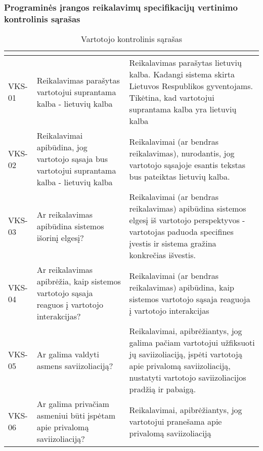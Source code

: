 \documentclass{VUMIFPSkursinis}
\begin{document}
			\subsubsection{Programinės įrangos reikalavimų specifikacijų vertinimo kontrolinis sąrašas}
			\begin{center}

				\begin{longtable}{|C{2cm}|L{5cm}|L{8cm}|}

					\caption{Vartotojo kontrolinis sąrašas}
					\label{table:VKS}

 					\\ \hline
 					 &
  					 & 
 					\\ \hline
 					VKS-01 &
 					Reikalavimas parašytas vartotojui suprantama kalba - lietuvių kalba& 
 					Reikalavimas parašytas lietuvių kalba. Kadangi sistema skirta Lietuvos Respublikos gyventojams. Tikėtina, kad vartotojui suprantama kalba yra lietuvių kalba\\ \hline
 					VKS-02 &
 					Reikalavimai apibūdina, jog vartotojo sąsaja bus vartotojui suprantama kalba - lietuvių kalba&
 					Reikalavimai (ar bendras reikalavimas), nurodantis, jog vartotojo sąsajoje esantis tekstas bus pateiktas lietuvių kalba.\\ \hline
 					VKS-03 &
 					Ar reikalavimas apibūdina sistemos išorinį elgesį? & 
					Reikalavimai (ar bendras reikalavimas) apibūdina sistemos elgesį iš vartotojo perspektyvos - vartotojas paduoda specifines įvestis ir sistema gražina konkrečias išvestis.\\ \hline  
 					VKS-04 &
 					Ar reikalavimas apibrėžia, kaip sistemos vartotojo sąsaja reaguos į vartotojo interakcijas?& 
 					Reikalavimai (ar bendras reikalavimas) apibūdina, kaip sistemos vartotojo sąsaja reaguoja į vartotojo interakcijas\\ \hline    
 					VKS-05 &
 					Ar galima valdyti asmens saviizoliaciją?& 
 					Reikalavimai, apibrėžiantys, jog galima pačiam vartotojui užfiksuoti jų saviizoliaciją, įspėti vartotoją apie privalomą saviizoliaciją, nustatyti vartotojo saviizoliacijos pradžią ir pabaigą.\\ \hline  
 					VKS-06 &
 					Ar galima privačiam asmeniui būti įspėtam apie privalomą saviizoliaciją?& 
 					Reikalavimai, apibrėžiantys, jog vartotojui pranešama apie privalomą saviizoliaciją\\ \hline   					

\end{longtable}
\end{center}
\end{document}

